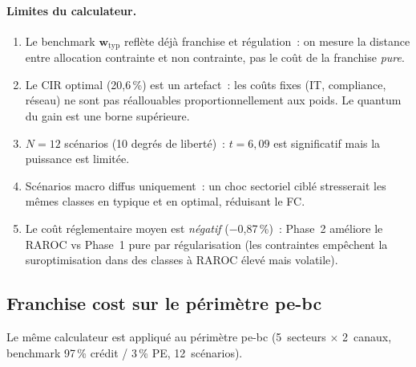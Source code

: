 \documentclass[10pt, a4paper, oneside]{report}
\theoremstyle{definition}
\begin{document}
\paragraph{Limites du calculateur.}
\begin{enumerate}[nosep]
  \item Le benchmark $\mathbf{w}_{\text{typ}}$ reflète déjà franchise et régulation~: on mesure la distance entre allocation contrainte et non contrainte, pas le coût de la franchise \emph{pure}.
  \item Le CIR optimal (20{,}6\,\%) est un artefact~: les coûts fixes (IT, compliance, réseau) ne sont pas réallouables proportionnellement aux poids. Le quantum du gain est une borne supérieure.
  \item $N = 12$ scénarios (10 degrés de liberté)~: $t = 6{,}09$ est significatif mais la puissance est limitée.
  \item Scénarios macro diffus uniquement~: un choc sectoriel ciblé stresserait les mêmes classes en typique et en optimal, réduisant le FC.
  \item Le coût réglementaire moyen est \emph{négatif} ($-$0{,}87\,\%)~: Phase~2 améliore le RAROC vs Phase~1 pure par régularisation (les contraintes empêchent la suroptimisation dans des classes à RAROC élevé mais volatile).
\end{enumerate}


\subsection*{Franchise cost sur le périmètre pe-bc}

Le même calculateur est appliqué au périmètre pe-bc (5~secteurs $\times$ 2~canaux, benchmark 97\,\% crédit / 3\,\% PE, 12~scénarios).
\end{document}
